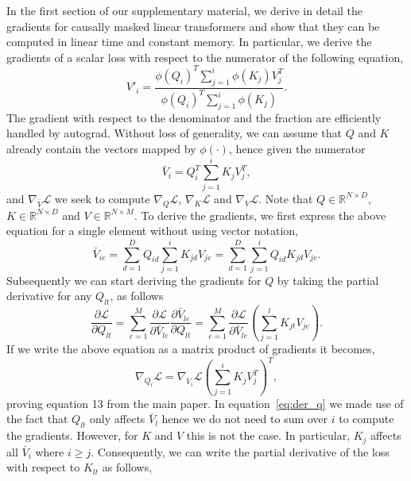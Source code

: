 \documentclass{article}
\newcommand{\R}[1]{\mathbb{R}^{#1}}
\newcommand{\fe}[1]{\phi\left(#1\right)}
\newcommand{\calL}{\mathcal{L}}
\newcommand{\der}[2]{\frac{\partial #1}{\partial #2}}
\begin{document}
In the first section of our supplementary material, we derive in detail the
gradients for causally masked linear transformers and show that they can be
computed in linear time and constant memory. In particular, we derive the
gradients of a scalar loss with respect to the numerator of the following
equation,
\begin{equation}
    V'_i = \frac{\fe{Q_i}^T \sum_{j=1}^i \fe{K_j} V_j^T}
                {\fe{Q_i}^T \sum_{j=1}^i \fe{K_j}}.
\end{equation}
The gradient with respect to the denominator and the fraction are efficiently
handled by autograd. Without loss of generality, we can assume that $Q$ and $K$
already contain the vectors mapped by $\fe{\cdot}$, hence given the numerator
\begin{equation}
    \bar{V}_i = Q_i^T \sum_{j=1}^i K_j V_j^T,
\end{equation}
and $\nabla_{\bar{V}}\calL$ we seek to compute $\nabla_{Q}\calL$,
$\nabla_{K}\calL$ and $\nabla_{V}\calL$. Note that $Q \in \R{N \times D}$, $K
\in \R{N \times D}$ and $V \in \R{N \times M}$. To derive the gradients, we
first express the above equation for a single element without using vector notation,
\begin{equation}
    \bar{V}_{ie} =
        \sum_{d=1}^D Q_{id} \sum_{j=1}^i K_{jd} V_{je} =
        \sum_{d=1}^D \sum_{j=1}^i Q_{id} K_{jd} V_{je}.
\end{equation}
Subsequently we can start deriving the gradients for $Q$ by taking the partial
derivative for any $Q_{lt}$, as follows
\begin{equation}
    \der{\calL}{Q_{lt}} = \sum_{e=1}^M \der{\calL}{\bar{V}_{le}} \der{\bar{V}_{le}}{Q_{lt}} =
        \sum_{e=1}^M \der{\calL}{\bar{V}_{le}} \left(
            \sum_{j=1}^l K_{jt} V_{je}
        \right). \label{eq:der_q}
\end{equation}
If we write the above equation as a matrix product of gradients it becomes,
\begin{equation}
    \nabla_{Q_i}\calL = \nabla_{\bar{V}_i}\calL \left(
        \sum_{j=1}^i K_j V_j^T
    \right)^T,
\end{equation}
proving equation 13 from the main paper. In equation~\ref{eq:der_q} we made use
of the fact that $Q_{lt}$ only affects $\bar{V}_{l}$ hence we do not need to
sum over $i$ to compute the gradients. However, for $K$ and $V$ this is not the
case. In particular, $K_j$ affects all $\bar{V}_i$ where $i \geq j$. Consequently,
we can write the partial derivative of the loss with respect to $K_{lt}$ as follows,
\end{document}
